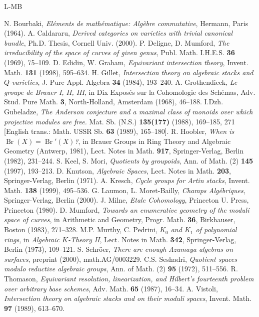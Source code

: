 \documentclass[12pt]{amsart}
\DeclareMathOperator{\Br}{Br}
\theoremstyle{plain}
\theoremstyle{definition}
\theoremstyle{remark}
\begin{document}
\begin{thebibliography}{L-MB}

 N. Bourbaki, {\it El\'ements de math\'ematique:
Alg\`ebre commutative}, Hermann, Paris (1964).
 A. Caldararu, {\it Derived categories
on varieties with trivial canonical
bundle}, Ph.D. Thesis, Cornell Univ. (2000).
 P. Deligne, D. Mumford, {\it The irreducibility of
the space of curves of given genus}, Publ. Math. I.H.E.S.
{\bf 36} (1969), 75--109.
 D. Edidin, W. Graham, {\it Equivariant intersection
theory}, Invent. Math. {\bf 131} (1998), 595--634.
 H. Gillet, {\it Intersection theory on algebraic stacks
and $Q$-varieties}, J. Pure Appl. Algebra {\bf 34} (1984), 193--240.
 A. Grothendieck, {\it Le groupe de Brauer I, II, III},
in Dix Expos\'es sur la Cohomologie des Sch\'emas,
Adv. Stud. Pure Math. {\bf 3}, North-Holland, Amsterdam (1968),
46--188.
 I.Dzh. Gubeladze,
{\it The Anderson conjecture and a maximal class of monoids over which
projective modules are free.}
Mat. Sb. (N.S.) {\bf 135(177)} (1988), 169--185, 271
[English trans.: Math. USSR Sb. {\bf 63} (1989), 165--180].
 R. Hoobler, {\it When is $\Br(X)=\Br'(X)$?}, in
Brauer Groups in Ring Theory and Algebraic Geometry
(Antwerp, 1981), Lect. Notes in Math. {\bf 917},
Springer-Verlag, Berlin (1982), 231--244.
 S. Keel, S. Mori, {\it Quotients by groupoids},
Ann. of Math. (2) {\bf 145} (1997), 193--213.
 D. Knutson, {\it Algebraic Spaces}, Lect. Notes
in Math. {\bf 203}, Springer-Verlag, Berlin (1971).
 A. Kresch, {\it Cycle groups for Artin stacks},
Invent. Math. {\bf 138} (1999), 495--536.
 G. Laumon, L. Moret-Bailly, {\it Champs
Alg\'ebriques}, Springer-Verlag, Berlin (2000).
 J. Milne, {\em Etale Cohomology},
Princeton U. Press, Princeton (1980).
 D. Mumford, {\it Towards an enumerative
geometry of the moduli space of curves}, in Arithmetic and Geometry,
Progr. Math. {\bf 36}, Birkhauser, Boston (1983), 271--328.
 M.P. Murthy, C. Pedrini, {\it $K_0$ and $K_1$ of
polynomial rings}, in {\it Algebraic $K$-Theory II},
Lect. Notes in Math. {\bf 342}, Springer-Verlag,
Berlin (1973), 109--121.
 S. Schr\"oer, {\it There are enough
Azumaya algebras on surfaces}, preprint (2000), math.AG/0003229.
 C.S. Seshadri, {\it Quotient spaces modulo reductive
algebraic groups}, Ann. of Math. (2) {\bf 95} (1972), 511--556.
 R. Thomason, {\it Equivariant resolution,
linearization, and Hilbert's fourteenth problem over arbitrary base
schemes}, Adv. Math. {\bf 65} (1987), 16--34.
 A. Vistoli, {\it Intersection theory on algebraic
stacks and on their moduli spaces}, Invent. Math. {\bf 97} (1989), 613--670.


\end{thebibliography}
\end{document}
